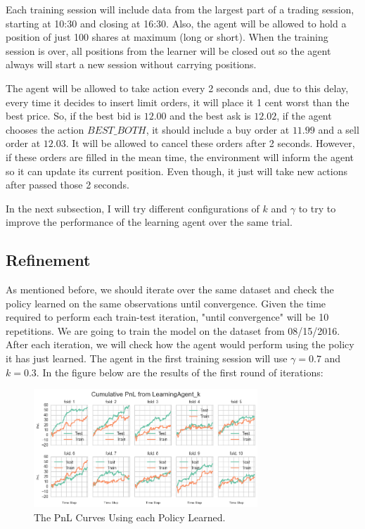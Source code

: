 \documentclass[a4paper]{article}
\begin{document}
Each training session will include data from the largest part of a trading session, starting at 10:30 and closing at 16:30. Also, the agent will be allowed to hold a position of just 100 shares at maximum (long or short). When the training session is over, all positions from the learner will be closed out so the agent always will start a new session without carrying positions.

The agent will be allowed to take action every 2 seconds and, due to this delay, every time it decides to insert limit orders, it will place it 1 cent worst than the best price. So, if the best bid is $12.00$ and the best ask is $12.02$, if the agent chooses the action $BEST\_BOTH$, it should include a buy order at $11.99$ and a sell order at $12.03$. It will be allowed to cancel these orders after 2 seconds. However, if these orders are filled in the mean time, the environment will inform the agent so it can update its current position. Even though, it just will take new actions after passed those 2 seconds.

In the next subsection, I will try different configurations of $k$ and $\gamma$ to try to improve the performance of the learning agent over the same trial.

\subsection{Refinement}
As mentioned before, we should iterate over the same dataset and check the policy learned on the same observations until convergence. Given the time required to perform each train-test iteration, "until convergence" will be 10 repetitions. We are going to train the model on the dataset from 08/15/2016. After each iteration, we will check how the agent would perform using the policy it has just learned. The agent in the first training session will use $\gamma=0.7$ and $k=0.3$. In the figure below are the results of the first round of iterations:

\begin{figure}[ht]
\centering
\includegraphics[width=0.75\textwidth]{figures/policy_tests_1.png}
\caption{\label{fig:olicy_test_1}The PnL Curves Using each Policy Learned.}
\end{figure}
\end{document}
